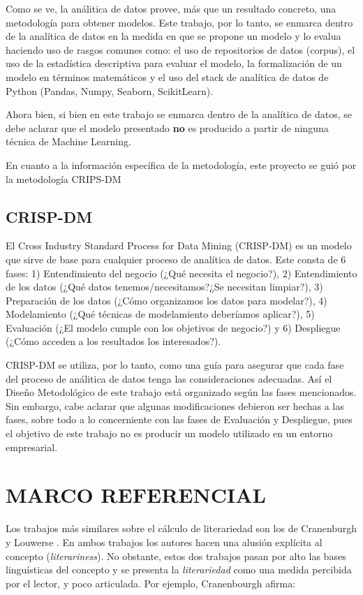 \documentclass[12pt,letterpaper,twoside]{article}
\begin{document}
Como se ve, la análitica de datos provee, más que un resultado
concreto, una metodología para obtener modelos. Este trabajo,
por lo tanto, se enmarca dentro de la analítica de datos
en la medida en que se propone un modelo y lo evalua haciendo
uso de rasgos comunes como: el uso de repositorios de datos
(corpus), el uso de la estadística descriptiva para evaluar
el modelo, la formalización de un modelo en términos matemáticos
y el uso del stack de analítica de datos de Python (Pandas, Numpy,
Seaborn, ScikitLearn).

Ahora bien, si bien en este trabajo se enmarca dentro de la
analítica de datos, se debe aclarar que el modelo presentado
\textbf{no} es producido a partir de ninguna técnica  de Machine Learning.

En cuanto a la información específica de la metodología, este
proyecto se guió por la metodología CRIPS-DM

\subsection{CRISP-DM}
\label{sec:orgfff9441}
El Cross Industry Standard Process for Data Mining (CRISP-DM) es
un modelo que sirve de base para cualquier proceso de analítica de
datos. Este consta de 6 fases: 1) Entendimiento del negocio (¿Qué
necesita el negocio?), 2) Entendimiento de los datos (¿Qué datos
tenemos/necesitamos?¿Se necesitan limpiar?), 3) Preparación de los
datos (¿Cómo organizamos los datos para modelar?), 4) Modelamiento
(¿Qué técnicas de modelamiento deberíamos aplicar?), 5) Evaluación
(¿El modelo cumple con los objetivos de negocio?) y 6) Despliegue
(¿Cómo acceden a los resultados los interesados?).

CRISP-DM se utiliza, por lo tanto, como una guía para
asegurar que cada fase del proceso de análitica de datos
tenga las consideraciones adecuadas. Así el Diseño Metodológico
de este trabajo está organizado según las fases mencionados.
Sin embargo, cabe aclarar que algunas modificaciones debieron
ser hechas a las fases, sobre todo a lo concerniente con las
fases de Evaluación y Despliegue, pues el objetivo de este
trabajo no es producir un modelo utilizado en un entorno empresarial.




\section{MARCO REFERENCIAL}
\label{sec:org7e1a5d7}

Los trabajos más similares sobre el cálculo de literariedad son los de
Cranenburgh \cite{van2019vector} y Louwerse
\cite{louwerse2008computationally}. En ambos trabajos los autores
hacen una alusión explícita al concepto (\emph{literariness}). No obstante,
estos dos trabajos pasan por alto las bases linguísticas del concepto
y se presenta la \emph{literariedad} como una medida percibida por el
lector, y poco articulada. Por ejemplo, Cranenbourgh afirma:
\end{document}
